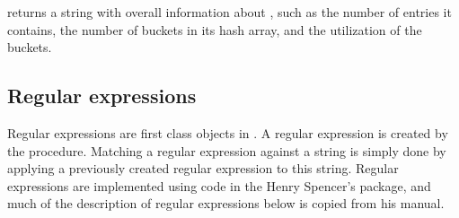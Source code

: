 \begin{entry}{
}
\saut %
 returns a string with overall information about
, such as the number of entries it contains, the number of
buckets in its hash array, and the utilization of the buckets.
\end{entry}



\subsection{Regular expressions}

\label{regexp-type}
Regular expressions are first class objects in
{\stk}. A regular expression is created by the 
procedure. Matching a regular expression against a string is simply done by
applying a previously created regular expression to this string. 
Regular expressions are implemented using code in the Henry Spencer's
package, and much of the description of regular expressions below is copied
from his manual.


